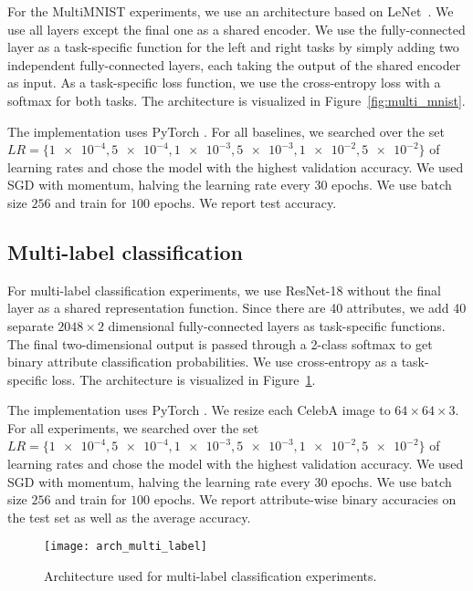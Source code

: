 \documentclass{article}
\begin{document}
For the MultiMNIST experiments, we use an architecture based on LeNet~\citep{mnist}. We use all layers except the final one as a shared encoder. We use the fully-connected layer as a task-specific function for the left and right tasks by simply adding two independent fully-connected layers, each taking the output of the shared encoder as input. As a task-specific loss function, we use the cross-entropy loss with a softmax for both tasks. The architecture is visualized in Figure~\ref{fig:multi_mnist}.

The implementation uses PyTorch \citep{pytorch}. For all baselines, we searched over the set $LR=\{\num{1e-4}, \num{5e-4}, \num{1e-3}, \num{5e-3}, \num{1e-2}, \num{5e-2}\}$ of learning rates and chose the model with the highest validation accuracy. We used SGD with momentum, halving the learning rate every 30 epochs. We use batch size $256$ and train for $100$ epochs. We report test accuracy.

\subsection{Multi-label classification}
For multi-label classification experiments, we use ResNet-18 \citep{resnet} without the final layer as a shared representation function. Since there are 40 attributes, we add 40 separate $2048\times2$ dimensional fully-connected layers as task-specific functions. The final two-dimensional output is passed through a 2-class softmax to get binary attribute classification probabilities. We use cross-entropy as a task-specific loss. The architecture is visualized in Figure~\ref{fig:arch_multi_label}.

The implementation uses PyTorch \citep{pytorch}. We resize each CelebA image \citep{celeba} to $64\times64\times3$. For all experiments, we searched over the set $LR=\{\num{1e-4}, \num{5e-4}, \num{1e-3}, \num{5e-3}, \num{1e-2}, \num{5e-2}\}$ of learning rates and chose the model with the highest validation accuracy. We used SGD with momentum, halving the learning rate every 30 epochs. We use batch size $256$ and train for $100$ epochs. We report attribute-wise binary accuracies on the test set as well as the average accuracy.

\begin{figure}[ht]
\texttt{[image: arch\_multi\_label]}
\caption{Architecture used for multi-label classification experiments.}
\label{fig:arch_multi_label}
\end{figure}
\end{document}
